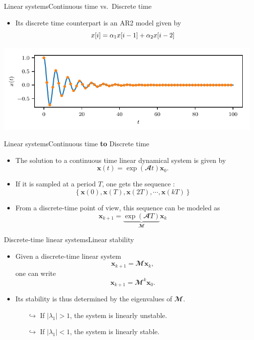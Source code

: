 \documentclass[usenames,dvipsnames,svgnames,10pt,aspectratio=169]{beamer}
\begin{document}
\begin{frame}[t, c]{Linear systems}{Continuous time vs.\ Discrete time}
	\centering
	\begin{itemize}
		\item Its discrete time counterpart is an AR2 model given by
		\begin{equation}
			x[i] = \alpha_1 x[i-1] + \alpha_2 x[i-2]
			\notag
		\end{equation}
	\end{itemize}
	\includegraphics[width=.75\textwidth]{second_order_system_bis}
\end{frame}

\begin{frame}{Linear systems}{Continuous time \textbf{to} Discrete time}
	\begin{itemize}
		\item The solution to a continuous time linear dynamical system is given by
		$$\mathbf{x}(t) = \exp \left( \mathbfcal{A} t \right) \textbf{x}_0.$$

		\item If it is sampled at a period $T$, one gets the sequence :
		$$\left\{ \mathbf{x}(0) , \mathbf{x}(T), \mathbf{x}(2T) , \cdots, \mathbf{x}(kT) \right\}$$

		\item From a discrete-time point of view, this sequence can be modeled as
		$$ \mathbf{x}_{k+1} = \underbrace{\exp \left( \mathbfcal{A} T \right) }_{\mathbfcal{M}} \mathbf{x}_k$$
	\end{itemize}
\end{frame}

\begin{frame}[t, c]{Discrete-time linear systems}{Linear stability}
	\begin{itemize}
		\item Given a discrete-time linear system
		$$\mathbf{x}_{k+1} = \mathbfcal{M} \mathbf{x}_k,$$
		one can write
		$$\mathbf{x}_{k+1} = \mathbfcal{M}^{k} \mathbf{x}_0.$$

		\bigskip

		\item Its stability is thus determined by the eigenvalues of $\mathbfcal{M}$.
		\begin{itemize}
			\item[$\hookrightarrow$] If $\vert \lambda_1 \vert > 1$, the system is linearly unstable.
			\item[$\hookrightarrow$] If $\vert \lambda_1 \vert < 1$, the system is linearly stable.
		\end{itemize}
	\end{itemize}

	\vspace{1cm}
\end{frame}
\end{document}
